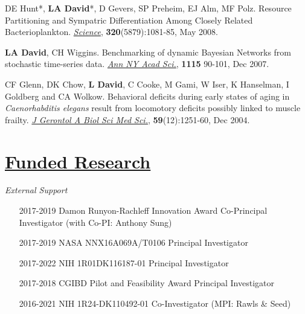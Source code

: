 \documentclass[overlapped,line,11pt]{res}
\begin{document}
\begin{resume}
\begin{revnumerate}[19]
\vspace*{1mm}
\item {DE Hunt*, \textbf{LA David}*, D Gevers, SP Preheim, EJ Alm, MF
Polz.  Resource Partitioning and Sympatric Differentiation Among
Closely Related Bacterioplankton.  \emph{\underline{Science}},
\textbf{320}(5879):1081-85, May 2008.}

\vspace*{1mm}
\item {\textbf{LA David}, CH Wiggins. Benchmarking of dynamic Bayesian
  Networks from stochastic time-series data. \emph{\underline{Ann NY Acad Sci.}},
  \textbf{1115} 90-101, Dec 2007.}

\vspace*{1mm}
\item {CF Glenn, DK Chow, \textbf{L David}, C Cooke, M Gami, W Iser, K
  Hanselman, I Goldberg and CA Wolkow. Behavioral deficits during
  early states of aging in {\em Caenorhabditis elegans} result from
  locomotory deficits possibly linked to muscle frailty. \emph{\underline{J
    Gerontol A Biol Sci Med Sci.}}, \textbf{59}(12):1251-60, Dec 2004.}
\end{revnumerate}

\section{\underline{\sc Funded Research}} 
\vspace{.1in}
\emph{External Support}
\vspace{.1in}

\begin{itemize}[leftmargin=2cm, style=sameline]

\item[2017-2019] Damon Runyon-Rachleff Innovation Award 
  \newline Co-Principal Investigator (with Co-PI:
  Anthony Sung)

\item[2017-2019] NASA NNX16A069A/T0106 \newline Principal Investigator


\item[2017-2022] NIH 1R01DK116187-01 \newline
  Principal Investigator

\item[2017-2018] CGIBD Pilot and Feasibility Award \newline Principal
  Investigator


\item[2016-2021] NIH 1R24-DK110492-01  \newline
  Co-Investigator (MPI: Rawls \& Seed)


\end{itemize}
\end{resume}
\end{document}

